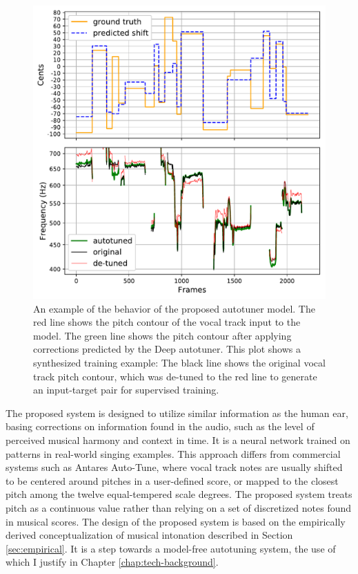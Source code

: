 \begin{figure}[t]
    \centering
    \includegraphics[width=\columnwidth]{figures/results.pdf}
    \caption{An example of the behavior of the proposed autotuner model. The red line shows the pitch contour of the vocal track input to the model. The green line shows the pitch contour after applying corrections predicted by the Deep autotuner. This plot shows a synthesized training example: The black line shows the original vocal track pitch contour, which was de-tuned to the red line to generate an input-target pair for supervised training.}
    \label{fig:results}
\end{figure}

The proposed system is designed to utilize similar information as the human ear, basing corrections on information found in the audio, such as the level of perceived musical harmony and context in time. It is a neural network trained on patterns in real-world singing examples. This approach differs from commercial systems such as Antares Auto-Tune, where vocal track notes are usually shifted to be centered around pitches in a user-defined score, or mapped to the closest pitch among the twelve equal-tempered scale degrees. The proposed system treats pitch as a continuous value rather than relying on a set of discretized notes found in musical scores. The design of the proposed system is based on the empirically derived conceptualization of musical intonation described in Section \ref{sec:empirical}. It is a step towards a model-free autotuning system, the use of which I justify in Chapter \ref{chap:tech-background}. 


